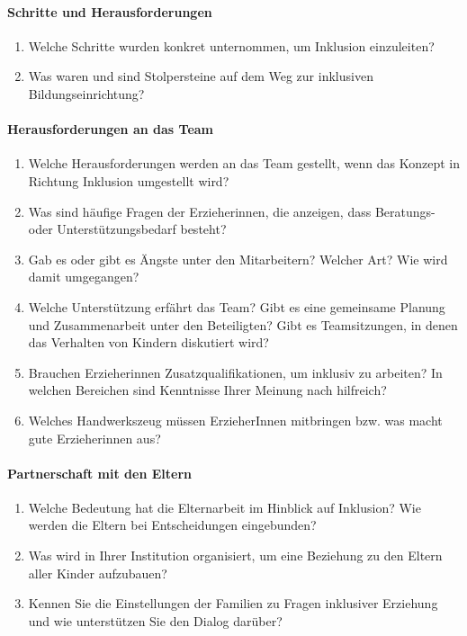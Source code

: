 \paragraph{Schritte und Herausforderungen}
\begin{enumerate}
\item Welche Schritte wurden konkret unternommen, um Inklusion einzuleiten?
\item Was waren und sind Stolpersteine auf dem Weg zur inklusiven Bildungseinrichtung? 
\end{enumerate}

\paragraph{Herausforderungen an das Team}
\begin{enumerate}
\item Welche Herausforderungen werden an das Team gestellt, wenn das Konzept in Richtung Inklusion umgestellt wird?
\item Was sind häufige Fragen der Erzieherinnen, die anzeigen, dass Beratungs- oder Unterstützungsbedarf besteht?
\item Gab es oder gibt es Ängste unter den Mitarbeitern? Welcher Art? Wie wird damit umgegangen?
\item Welche Unterstützung erfährt das Team? 
Gibt es eine gemeinsame Planung und Zusammenarbeit unter den Beteiligten? Gibt es Teamsitzungen, in denen das Verhalten von Kindern diskutiert wird? 
\item Brauchen Erzieherinnen Zusatzqualifikationen, um inklusiv zu arbeiten? 
In welchen Bereichen sind Kenntnisse Ihrer Meinung nach hilfreich?
\item Welches Handwerkszeug müssen ErzieherInnen mitbringen bzw. was macht gute Erzieherinnen aus?
\end{enumerate}

\paragraph{Partnerschaft mit den Eltern}
\begin{enumerate}
\item Welche Bedeutung hat die Elternarbeit im Hinblick auf Inklusion?
Wie werden die Eltern bei Entscheidungen eingebunden? 
\item Was wird in Ihrer Institution organisiert, um eine Beziehung zu den Eltern aller Kinder aufzubauen?
\item Kennen Sie die Einstellungen der Familien zu Fragen inklusiver Erziehung und wie unterstützen Sie den Dialog darüber?
\end{enumerate}

